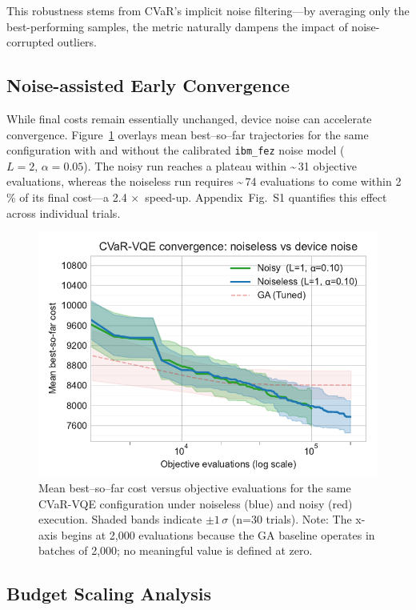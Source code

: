 This robustness stems from CVaR's implicit noise filtering—by averaging only 
the best-performing samples, the metric naturally dampens the impact of 
noise-corrupted outliers.

\subsection{Noise-assisted Early Convergence}

While final costs remain essentially unchanged, device noise can 
accelerate convergence. Figure~\ref{fig:learning_curves_noise} overlays 
mean best–so–far trajectories for the same configuration with and without 
the calibrated \texttt{ibm\_fez} noise model (\(L=2,\,\alpha=0.05\)). The 
noisy run reaches a plateau within \textasciitilde{}\,31 objective evaluations, whereas the noiseless 
run requires \textasciitilde{}\,74 evaluations to come within 2\,\% of its final cost—a 
2.4$\,\times$ speed-up. Appendix~Fig.~S1 quantifies this effect across individual 
trials.

\begin{figure}[h]
  \centering
  \includegraphics[width=.7\linewidth]{fig/learning_curves_noise.pdf}
  \caption{Mean best–so–far cost versus objective evaluations for the same
           CVaR-VQE configuration under noiseless (blue) and noisy (red) execution.
           Shaded bands indicate $\pm1\,\sigma$ (n=30 trials).
           Note: The x-axis begins at 2,000 evaluations because the GA baseline operates in batches of 2,000; no meaningful value is defined at zero.}
  \label{fig:learning_curves_noise}
\end{figure}

\subsection{Budget Scaling Analysis}

